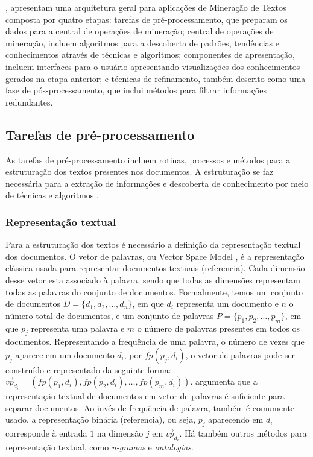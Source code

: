 \documentclass[normaltoc, espacoumemeio, pnumromarab,ruledheader]{abnt}
\begin{document}

, apresentam uma arquitetura geral para aplicações de Mineração de Textos composta por quatro etapas: tarefas de pré-processamento, que preparam os dados para a central de operações de mineração; central de operações de mineração, incluem algoritmos para a descoberta de padrões, tendências e conhecimentos através de técnicas e algoritmos; componentes de apresentação, incluem interfaces para o usuário apresentando visualizações dos conhecimentos gerados na etapa anterior; e técnicas de refinamento, também descrito como uma fase de pós-processamento, que inclui métodos para filtrar informações redundantes.

	\subsection{Tarefas de pré-processamento}

	As tarefas de pré-processamento incluem rotinas, processos e métodos para a estruturação dos textos presentes nos documentos.
	A estruturação se faz necessária para a extração de informações e descoberta de conhecimento por meio de técnicas e algoritmos \cite{Hotho2005}.

	\subsubsection{Representação textual}

	Para a estruturação dos textos é necessário a definição da representação textual dos documentos.
	O vetor de palavras, ou Vector Space Model \cite{Salton1975}, é a representação clássica usada para representar documentos textuais (referencia). Cada dimensão desse vetor esta associado à palavra, sendo que todas as dimensões representam todas as palavras do conjunto de documentos.
	Formalmente, temos um conjunto de documentos $D = \{ d_1, d_2, \dots, d_n \}$, em que $d_i$ representa um documento e $n$ o número total de documentos, e um conjunto de palavras $P = \{ p_1, p_2, \dots, p_m \}$, em que $p_j$ representa uma palavra e $m$ o número de palavras presentes em todos os documentos.
	Representando a frequência de uma palavra, o número de vezes que $p_j$ aparece em um documento $d_i$, por $fp(p_j, d_i)$, o vetor de palavras pode ser construído e representado da seguinte forma: $\vec{vp}_{d_i} = ( fp(p_1, d_i), fp(p_2, d_i), \dots, fp(p_m, d_i) )$.
	 argumenta que a representação textual de documentos em vetor de palavras é suficiente para separar documentos.
	Ao invés de frequência de palavra, também é comumente usado, a representação binária (referencia), ou seja, $p_j$ aparecendo em $d_i$ corresponde à entrada $1$ na dimensão $j$ em $\vec{vp}_{d_i}$.
	Há também outros métodos para representação textual, como \textit{n-gramas} e \textit{ontologias}.
\end{document}

